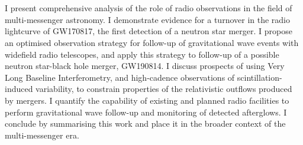 \chapter*{}

I present comprehensive analysis of the role of radio observations in the field of multi-messenger astronomy. I demonstrate evidence for a turnover in the radio lightcurve of GW170817, the first detection of a neutron star merger. I propose an optimised observation strategy for follow-up of gravitational wave events with widefield radio telescopes, and apply this strategy to follow-up of a possible neutron star-black hole merger, GW190814. I discuss prospects of using Very Long Baseline Interferometry, and high-cadence observations of scintillation-induced variability, to constrain properties of the relativistic outflows produced by mergers. I quantify the capability of existing and planned radio facilities to perform gravitational wave follow-up and monitoring of detected afterglows. I conclude by summarising this work and place it in the broader context of the multi-messenger era.